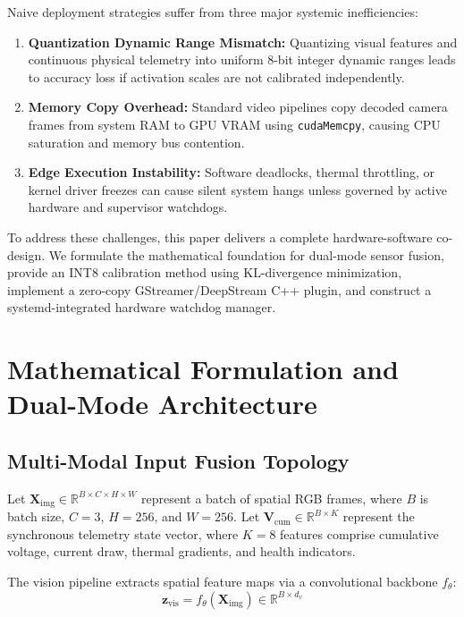 \documentclass[10pt,journal,compsoc]{IEEEtran}
\begin{document}
Naive deployment strategies suffer from three major systemic inefficiencies:
\begin{enumerate}
    \item \textbf{Quantization Dynamic Range Mismatch:} Quantizing visual features and continuous physical telemetry into uniform 8-bit integer dynamic ranges leads to accuracy loss if activation scales are not calibrated independently.
    \item \textbf{Memory Copy Overhead:} Standard video pipelines copy decoded camera frames from system RAM to GPU VRAM using \texttt{cudaMemcpy}, causing CPU saturation and memory bus contention.
    \item \textbf{Edge Execution Instability:} Software deadlocks, thermal throttling, or kernel driver freezes can cause silent system hangs unless governed by active hardware and supervisor watchdogs.
\end{enumerate}

To address these challenges, this paper delivers a complete hardware-software co-design. We formulate the mathematical foundation for dual-mode sensor fusion, provide an INT8 calibration method using KL-divergence minimization, implement a zero-copy GStreamer/DeepStream C++ plugin, and construct a systemd-integrated hardware watchdog manager.

\section{Mathematical Formulation and Dual-Mode Architecture}

\subsection{Multi-Modal Input Fusion Topology}
Let $\mathbf{X}_{\text{img}} \in \mathbb{R}^{B \times C \times H \times W}$ represent a batch of spatial RGB frames, where $B$ is batch size, $C=3$, $H=256$, and $W=256$. Let $\mathbf{V}_{\text{cum}} \in \mathbb{R}^{B \times K}$ represent the synchronous telemetry state vector, where $K=8$ features comprise cumulative voltage, current draw, thermal gradients, and health indicators.

The vision pipeline extracts spatial feature maps via a convolutional backbone $f_{\theta}$:
\begin{equation}
\mathbf{z}_{\text{vis}} = f_{\theta}(\mathbf{X}_{\text{img}}) \in \mathbb{R}^{B \times d_v}
\end{equation}
\end{document}
